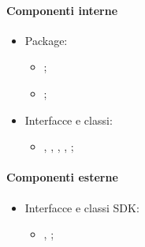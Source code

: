 \documentclass[../Funzionalita.tex]{subfiles}
\begin{document}
			\paragraph*{Componenti interne}
			\begin{itemize}
			
				\item Package:
				\begin{itemize}
					\item[] \view;
					\item[] \presenter;
				\end{itemize}
				
				\item Interfacce e classi:
				\begin{itemize}
					\item[] \NavigationActivity, \PoiCategoryActivity, \NavigationView, \PoiCategoryView, \NavigationAdapter;
				\end{itemize}
				
			\end{itemize}
			
			
			\paragraph*{Componenti esterne}
			
			\begin{itemize}
				\item Interfacce e classi SDK:
				\begin{itemize}
					\item[] \Activity, \AppCompatActivity;
				\end{itemize}
			\end{itemize}
					
		
\end{document}
